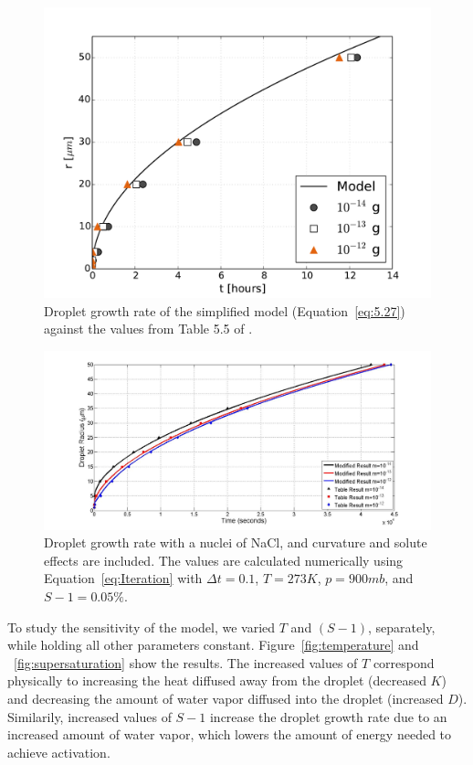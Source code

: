 \documentclass[titlepage]{article}
\begin{document}
\begin{figure}[h]
    \centering
    \includegraphics[width=\textwidth]{r_t.pdf}
    \caption{Droplet growth rate of the simplified model (Equation~\eqref{eq:5.27}) against the values from Table 5.5 of \cite{Curry}.}
    \label{fig:r_t}
\end{figure}

\begin{figure}[h]
    \centering
    \includegraphics[width=\textwidth]{r_t_modified.jpg}
    \caption{Droplet growth rate with a nuclei of NaCl, and curvature and solute effects are included. The values are calculated numerically using Equation~\eqref{eq:Iteration} with $\Delta t = 0.1$, $T = 273 K$, $p = 900 mb$, and $S - 1 = 0.05 \%$.}
    \label{fig:r_t_modified}
\end{figure}


To study the sensitivity of the model, we varied $T$ and $(S - 1)$, separately,
while holding all other parameters constant. Figure~\ref{fig:temperature} and
~\ref{fig:supersaturation} show the results. The increased values of $T$
correspond physically to increasing the heat diffused away from the droplet
(decreased $K$) and decreasing the amount of water vapor diffused into the
droplet (increased $D$).  Similarily, increased values of $S - 1$ increase the
droplet growth rate due to an increased amount of water vapor, which lowers the
amount of energy needed to achieve activation.
\end{document}
